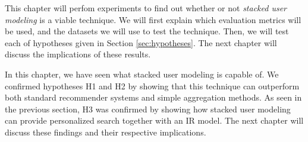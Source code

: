 \label{chap:results}

This chapter will perfom experiments to find out whether or not
\emph{stacked user modeling} is a viable technique.
We will first explain which evaluation metrics will be used,
and the datasets we will use to test the technique.
Then, we will test each of hypotheses given in Section \ref{sec:hypotheses}.
The next chapter will discuss the implications of these results.







\hr

In this chapter, we have seen what stacked user modeling is capable of.
We confirmed hypotheses H1 and H2 by showing that this technique
can outperform both standard recommender systems and 
simple aggregation methods. As seen in the previous section,
H3 was confirmed by showing how stacked user modeling can provide
personalized search together with an IR model.
The next chapter will discuss these findings and their respective implications.

